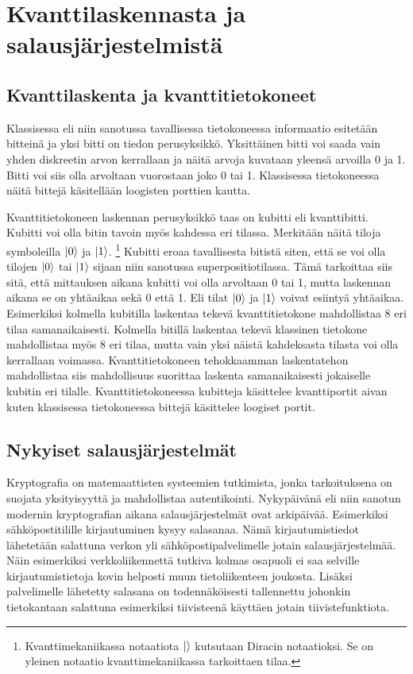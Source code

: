 \chapter{Kvanttilaskennasta ja salausjärjestelmistä\label{methods}}

\section{Kvanttilaskenta ja kvanttitietokoneet}
Klassisessa eli niin sanotussa tavallisessa tietokoneessa informaatio esitetään bitteinä ja yksi bitti on tiedon perusyksikkö. Yksittäinen bitti voi saada vain yhden diskreetin arvon kerrallaan ja näitä arvoja kuvataan yleensä arvoilla 0 ja 1. Bitti voi siis olla arvoltaan vuorostaan joko 0 tai 1. Klassisessa tietokoneessa näitä bittejä käsitellään loogisten porttien kautta.

Kvanttitietokoneen laskennan perusyksikkö taas on kubitti eli kvanttibitti. Kubitti voi olla bitin tavoin myös kahdessa eri tilassa. Merkitään näitä tiloja symboleilla
$\ket{0}$ ja $\ket{1}$. \footnote{Kvanttimekaniikassa notaatiota $\ket{}$ kutsutaan Diracin notaatioksi. Se on yleinen notaatio kvanttimekaniikassa tarkoittaen tilaa.} Kubitti eroaa tavallisesta bitistä siten, että se voi olla tilojen $\ket{0}$ tai $\ket{1}$ sijaan niin sanotussa superpositiotilassa. Tämä tarkoittaa siis sitä, että mittauksen aikana kubitti voi olla arvoltaan 0 tai 1, mutta laskennan aikana se on yhtäaikaa sekä 0 että 1. Eli tilat $\ket{0}$ ja $\ket{1}$ voivat esiintyä yhtäaikaa. Esimerkiksi kolmella kubitilla laskentaa tekevä kvanttitietokone mahdollistaa 8 eri tilaa samanaikaisesti. Kolmella bitillä laskentaa tekevä klassinen tietokone mahdollistaa myös 8 eri tilaa, mutta vain yksi näistä kahdeksasta tilasta voi olla kerrallaan voimassa. Kvanttitietokoneen tehokkaamman laskentatehon mahdollistaa siis mahdollisuus suorittaa laskenta samanaikaisesti jokaiselle kubitin eri tilalle. Kvanttitietokoneessa kubitteja käsittelee kvanttiportit aivan kuten klassisessa tietokoneessa bittejä käsittelee loogiset portit.

\section{Nykyiset salausjärjestelmät}
Kryptografia on matemaattisten systeemien tutkimista, jonka tarkoituksena on suojata yksityisyyttä ja mahdollistaa autentikointi. Nykypäivänä eli niin sanotun modernin kryptografian aikana salausjärjestelmät ovat arkipäivää. Esimerkiksi sähköpostitilille kirjautuminen kysyy salasanaa. Nämä kirjautumistiedot lähetetään salattuna verkon yli sähköpostipalvelimelle jotain salausjärjestelmää. Näin esimerkiksi verkkoliikennettä tutkiva kolmas osapuoli ei saa selville kirjautumistietoja kovin helposti muun tietoliikenteen joukosta. Lisäksi palvelimelle lähetetty salasana on todennäköisesti tallennettu johonkin tietokantaan salattuna esimerkiksi tiivisteenä käyttäen jotain tiivistefunktiota.

